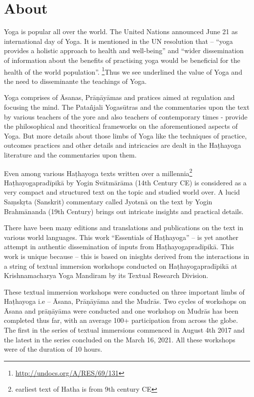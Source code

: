 \thispagestyle{empty}

\chapter*{About}\label{about}

Yoga is popular all over the world. The United Nations announced June 21 as international day of Yoga. It is mentioned in the UN resolution that – “yoga provides a holistic approach to health and well-being” and “wider dissemination of information about the benefits of practising yoga would be beneficial for the health of the world population”. \footnote{\url{http://undocs.org/A/RES/69/131}}Thus we see underlined the value of Yoga and the need to disseminante the teachings of Yoga.
\medskip

Yoga comprises of Āsanas, Prāṇāyāmas and pratices aimed at regulation and focusing the mind. The Patañjali Yogasūtras and the commentaries upon the text by various teachers of the yore and also teachers of contemporary times - provide the philosophical and theoritical frameworks on the aforementioned aspects of Yoga. But more details about those limbs of Yoga like the techniques of practice, outcomes practices and other details and intricacies are dealt in the Haṭhayoga literature and the commentaries upon them.
\medskip

Even among various Haṭhayoga texts written over a millennia\footnote{earliest text of Hatha is from 9th century CE} Haṭhayogapradīpikā by Yogin Svātmārāma (14th Century CE) is considered as a very compact and structured text on the topic and studied world over. A lucid Saṃskṛta (Sanskrit) commentary called Jyotsnā on the text by Yogin Brahmānanda (19th Century) brings out intricate insights and practical details. 
\medskip

There have been many editions and translations and publications on the text in various world languages. This work “Essentials of Haṭhayoga” – is yet another attempt in authentic dissemination of inputs from Haṭhayogapradīpikā. This work is unique because – this is based on inisghts derived from the interactions in a string of textual immersion workshops conducted on Haṭhayogapradīpikā at Krishnamacharya Yoga Mandiram by its Textual Research Division. 
\medskip

These textual immersion workshops were conducted on three important limbs of Haṭhayoga i.e – Āsana, Prāṇāyāma and the Mudrās. Two cycles of workshops on Āsana and prāṇāyāma were conducted and one workshop on Mudrās has been completed thus far, with an average 100+ participation from across the globe. The first in the series of textual immersions commenced in August 4th 2017 and the latest in the series concluded on the March 16, 2021. All these workshops were of the duration of 10 hours.
\medskip

